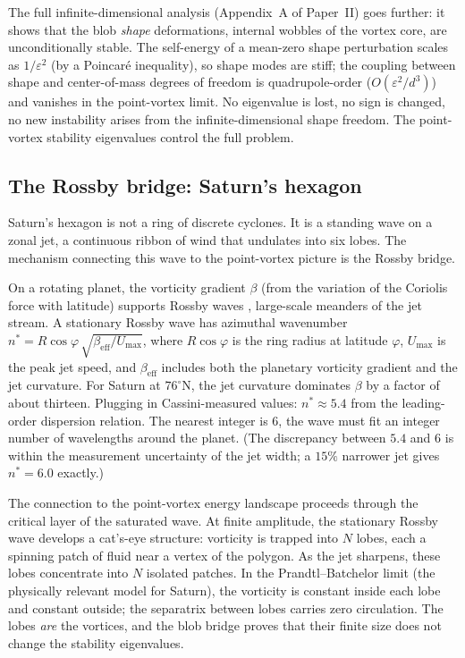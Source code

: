 The full infinite-dimensional analysis (Appendix~A of Paper~II) goes
further: it shows that the blob \emph{shape} deformations, internal
wobbles of the vortex core, are unconditionally stable. The self-energy
of a mean-zero shape perturbation scales as $1/\varepsilon^2$ (by a
Poincar\'e inequality), so shape modes are stiff; the coupling between
shape and center-of-mass degrees of freedom is quadrupole-order
($O(\varepsilon^2/d^3)$) and vanishes in the point-vortex limit. No
eigenvalue is lost, no sign is changed, no new instability arises from
the infinite-dimensional shape freedom. The point-vortex stability
eigenvalues control the full problem.

\subsection*{The Rossby bridge: Saturn's hexagon}

Saturn's hexagon is not a ring of discrete cyclones. It is a standing
wave on a zonal jet, a continuous ribbon of wind that undulates into
six lobes. The mechanism connecting this wave to the point-vortex
picture is the Rossby bridge.

On a rotating planet, the vorticity gradient $\beta$ (from the
variation of the Coriolis force with latitude) supports Rossby waves
, large-scale meanders of the jet stream. A stationary Rossby wave
has azimuthal wavenumber
$n^* = R\cos\varphi\,\sqrt{\beta_{\mathrm{eff}}/U_{\max}}$,
where $R\cos\varphi$ is the ring radius at latitude $\varphi$,
$U_{\max}$ is the peak jet speed, and $\beta_{\mathrm{eff}}$ includes
both the planetary vorticity gradient and the jet curvature. For Saturn
at $76^\circ$N, the jet curvature dominates $\beta$ by a factor of
about thirteen. Plugging in Cassini-measured values:
$n^* \approx 5.4$ from the leading-order dispersion relation. The
nearest integer is $6$, the wave must fit an integer number of
wavelengths around the planet. (The discrepancy between $5.4$ and $6$
is within the measurement uncertainty of the jet width; a $15\%$
narrower jet gives $n^* = 6.0$ exactly.)

The connection to the point-vortex energy landscape proceeds through
the critical layer of the saturated wave. At finite amplitude, the
stationary Rossby wave develops a cat's-eye structure: vorticity is
trapped into $N$ lobes, each a spinning patch of fluid near a vertex
of the polygon. As the jet sharpens, these lobes concentrate into $N$
isolated patches. In the Prandtl--Batchelor limit (the physically
relevant model for Saturn), the vorticity is constant inside each lobe
and constant outside; the separatrix between lobes carries zero
circulation. The lobes \emph{are} the vortices, and the blob bridge
proves that their finite size does not change the stability
eigenvalues.

